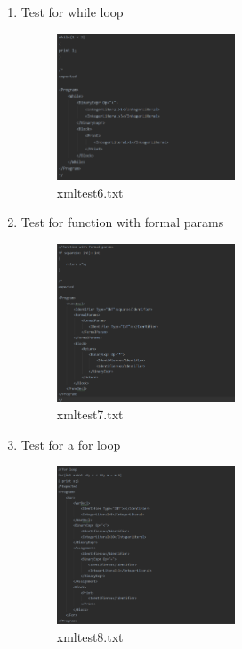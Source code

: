 \documentclass{article}
\begin{document}
\begin{enumerate}
					\item Test for while loop
					\begin{figure}[H]
					\centering
			 			\includegraphics[width=0.5\textwidth]{xmltest6.png}
			 			\centering
			  			\caption{xmltest6.txt}
			  			\label{fig:xmltest6}
					\end{figure}
					
					\item Test for function with formal params
					
									\begin{figure}[H]
					\centering
			 			\includegraphics[width=0.5\textwidth]{xmltest7.png}
			 			\centering
			  			\caption{xmltest7.txt}
			  			\label{fig:xmltest7}
					\end{figure}
					
					\item Test for a for loop
					\begin{figure}[H]
					\centering
			 			\includegraphics[width=0.5\textwidth]{xmltest8.png}
			 			\centering
			  			\caption{xmltest8.txt}
			  			\label{fig:xmltest8}
					\end{figure}


\end{enumerate}
\end{document}
